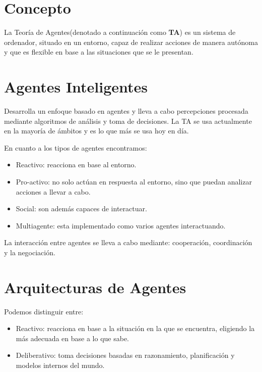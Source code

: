 \section{Concepto}
La Teoría de Agentes(denotado a continuación como \textbf{TA}) es un sistema de ordenador, situado en un entorno, capaz de realizar acciones de manera autónoma y que es flexible en base a las situaciones que se le presentan.

\section{Agentes Inteligentes}

Desarrolla un enfoque basado en agentes y lleva a cabo percepciones procesada mediante algoritmos de análisis y toma de decisiones. 
La TA se usa actualmente en la mayoría de ámbitos y es lo que más se usa hoy en día.

En cuanto a los tipos de agentes encontramos:

\begin{itemize}
    \item Reactivo: reacciona en base al entorno.
    \item Pro-activo: no solo actúan en respuesta al entorno, sino que puedan analizar acciones a llevar a cabo.
    \item  Social: son además capaces de interactuar.
    \item Multiagente: esta implementado como varios agentes interactuando.
\end{itemize}

La interacción entre agentes se lleva a cabo mediante: cooperación, coordinación y la negociación.


\section{Arquitecturas de Agentes}

Podemos distinguir entre:

\begin{itemize}
    \item Reactivo: reacciona en base a la situación en la que se encuentra, eligiendo la más adecuada en base a lo que sabe.
    \item Deliberativo: toma decisiones basadas en razonamiento, planificación y modelos internos del mundo.
\end{itemize}